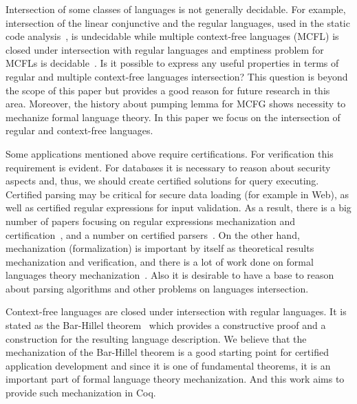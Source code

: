 Intersection of some classes of languages is not generally decidable.
For example, intersection of the linear conjunctive and the regular languages, used in the static code analysis~\cite{zhang2017context}, is undecidable while multiple context-free languages (MCFL) is closed under intersection with regular languages and emptiness problem for MCFLs is decidable~\cite{SEKI1991191}.
Is it possible to express any useful properties in terms of regular and multiple context-free languages intersection?
This question is beyond the scope of this paper but provides a good reason for future research in this area.
Moreover, the history about pumping lemma for MCFG shows necessity to mechanize formal language theory.
In this paper we focus on the intersection of regular and context-free languages.

Some applications mentioned above require certifications.
For verification this requirement is evident.
For databases it is necessary to reason about security aspects and, thus, we should create certified solutions for query executing.
Certified parsing may be critical for secure data loading (for example in Web), as well as certified regular expressions for input validation.
As a result, there is a big number of papers focusing on regular expressions mechanization and certification~\cite{10.1007/978-3-319-03545-1_7}, and a number on certified parsers~\cite{10.1007/978-3-642-00590-9_12,firsov2014certified,Gross2015ParsingPA}.
On the other hand, mechanization (formalization) is important by itself as theoretical results mechanization and verification, and there is a lot of work done on formal languages theory mechanization~\cite{firsov2015certified,ramos2016formalization,1885-16399}.
Also it is desirable to have a base to reason about parsing algorithms and other problems on languages intersection.

Context-free languages are closed under intersection with regular languages.
It is stated as the Bar-Hillel theorem~\cite{bar1961formal} which provides a constructive proof and a construction for the resulting language description.
We believe that the mechanization of the Bar-Hillel theorem is a good starting point for certified application development and since it is one of fundamental theorems, it is an important part of formal language theory mechanization.
And this work aims to provide such mechanization in Coq.

